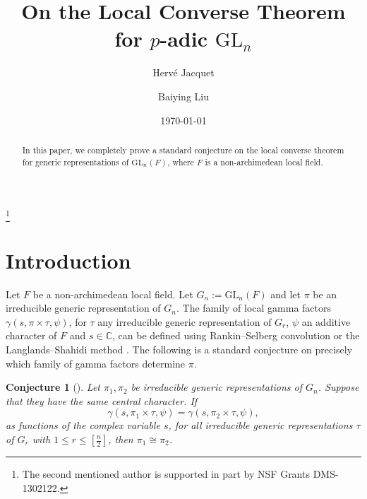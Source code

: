 \documentclass[12pt]{amsart}
\newtheorem {conj}[thm]{Conjecture}
\begin{document}

\title[Local Converse Theorem]{On the Local Converse Theorem for $p$-adic ${{\mathrm{GL}}}_n$}

\author{Herv\'e Jacquet}
\address{Mathematics Department\\
Columbia University\\
Rm 615, MC 4408 2990 Broadway\\
New York, NY 10027 USA}

\author{Baiying Liu}
\address{School of Mathematics\\
Institute for Advanced Study\\
Einstein Drive\\
Princeton, NJ 08540 USA}

\begin{abstract}
In this paper, we completely prove a standard conjecture on the local converse theorem for generic representations of ${{\mathrm{GL}}}_n(F)$, where $F$ is a non-archimedean local field.
\end{abstract}

\date{\today}
\thanks{The second mentioned author is supported in part by NSF Grants DMS-1302122.}
\maketitle

\section{Introduction}\label{intro}

Let $F$ be a non-archimedean local field.
Let $G_n:={{\mathrm{GL}}}_n(F)$ and let $\pi$ be an
irreducible generic representation of $G_n$. The family
of local gamma factors $\gamma(s, \pi \times \tau, \psi)$, for $\tau$ any irreducible generic representation of $G_r$, $\psi$ an additive character of $F$ and $s\in{{\mathbb {C}}}$, can be
defined using Rankin--Selberg convolution \cite{JPSS83} or the
Langlands--Shahidi method \cite{S84}. The following is a standard conjecture on precisely which family of gamma factors determine $\pi$. 

\begin{conj}[]\label{lcp}
Let $\pi_1,\pi_2$ be irreducible generic representations
of $G_n$. Suppose that they have the same central character.
If
\[
\gamma(s, \pi_1 \times \tau, \psi) = \gamma(s, \pi_2 \times \tau, \psi),
\]
as functions of the complex variable $s$, for all irreducible
generic representations $\tau$ of $G_r$ with $1 \leq r \leq 
[\frac{n}{2}]$, then $\pi_1 \cong \pi_2$.
\end{conj}
\end{document}
